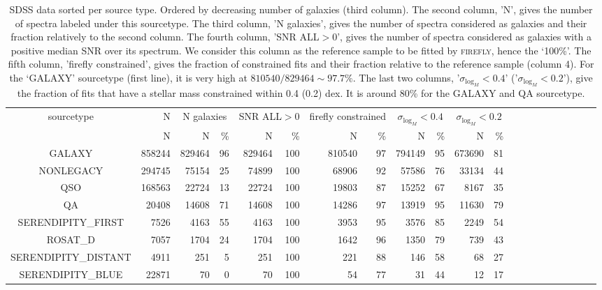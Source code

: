 \documentclass[onecolumn]{aa}
\begin{document}
\begin{table*}
\begin{center}
\caption{\label{ref:table:sdss:src:firefly}SDSS data sorted per source type. Ordered by decreasing number of galaxies (third column). 
The second column, 'N', gives the number of spectra labeled under this sourcetype. 
The third column, 'N galaxies', gives the number of spectra considered as galaxies and their fraction relatively to the second column. 
The fourth column, 'SNR ALL$>0$', gives the number of spectra considered as galaxies with a positive median SNR over its spectrum. We consider this column as the reference sample to be fitted by \textsc{firefly}, hence the `100\%'. 
The fifth column, 'firefly constrained', gives the fraction of constrained fits and their fraction relative to the reference sample (column 4). 
For the `GALAXY' sourcetype (first line), it is very high at $810540/829464 \sim 97.7\%$. 
The last two columns, '$\sigma_{\log_M}<0.4$' ('$\sigma_{\log_M}<0.2$'), give the fraction of fits that have a stellar mass constrained within 0.4 (0.2) dex. 
It is around 80\% for the GALAXY and QA sourcetype. 
}
\begin{tabular}{c rrr rrr rrrrrrrrrrrrrr}
\hline \hline
sourcetype & N & \multicolumn{2}{c}{N galaxies} & \multicolumn{2}{c}{SNR ALL$>0$} & \multicolumn{2}{c}{firefly constrained} & \multicolumn{2}{c}{$\sigma_{\log_M}<0.4$} & \multicolumn{2}{c}{$\sigma_{\log_M}<0.2$} \\ 
 & N & N & \% & N & \% & N & \% & N & \% & N & \%  \\ 
\hline 
GALAXY & 858244 & 829464 & 96 & 829464 & 100 & 810540 & 97 & 794149 & 95 & 673690 & 81 \\ 
NONLEGACY & 294745 & 75154 & 25 & 74899 & 100 & 68906 & 92 & 57586 & 76 & 33134 & 44 \\ 
QSO & 168563 & 22724 & 13 & 22724 & 100 & 19803 & 87 & 15252 & 67 & 8167 & 35 \\ 
QA & 20408 & 14608 & 71 & 14608 & 100 & 14286 & 97 & 13919 & 95 & 11630 & 79 \\ 
SERENDIPITY\_FIRST & 7526 & 4163 & 55 & 4163 & 100 & 3953 & 95 & 3576 & 85 & 2249 & 54 \\ 
ROSAT\_D & 7057 & 1704 & 24 & 1704 & 100 & 1642 & 96 & 1350 & 79 & 739 & 43 \\ 
SERENDIPITY\_DISTANT & 4911 & 251 & 5 & 251 & 100 & 221 & 88 & 146 & 58 & 68 & 27 \\ 
SERENDIPITY\_BLUE & 22871 & 70 & 0 & 70 & 100 & 54 & 77 & 31 & 44 & 12 & 17 \\ 

\end{tabular}
\end{center}
\end{table*}
\end{document}
